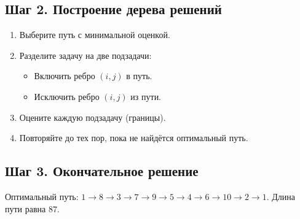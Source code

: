 \documentclass{article}
\begin{document}
\subsection*{Шаг 2. Построение дерева решений}

\begin{enumerate}
    \item Выберите путь с минимальной оценкой.
    \item Разделите задачу на две подзадачи:
          \begin{itemize}
              \item Включить ребро $(i, j)$ в путь.
              \item Исключить ребро $(i, j)$ из пути.
          \end{itemize}
    \item Оцените каждую подзадачу (границы).
    \item Повторяйте до тех пор, пока не найдётся оптимальный путь.
\end{enumerate}

\subsection*{Шаг 3. Окончательное решение}

Оптимальный путь: $1 \to 8 \to 3 \to 7 \to 9 \to 5 \to 4 \to 6 \to 10 \to 2 \to 1$. Длина пути равна $87$.
\end{document}

